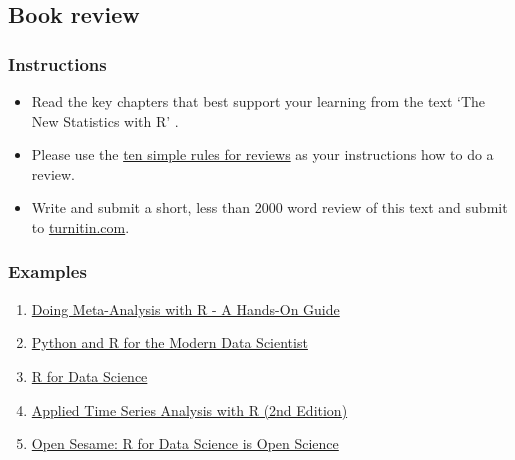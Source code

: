 \documentclass[
]{book}
\providecommand{\tightlist}{%
  \setlength{\itemsep}{0pt}\setlength{\parskip}{0pt}}
\begin{document}
\hypertarget{book-review}{%
\subsection*{Book review}\label{book-review}}

\hypertarget{instructions-1}{%
\subsubsection*{Instructions}\label{instructions-1}}

\begin{itemize}
\tightlist
\item
  Read the key chapters that best support your learning from the text `The New Statistics with R' \citep{RN6087}.\\
\item
  Please use the \href{https://journals.plos.org/ploscompbiol/article?id=10.1371/journal.pcbi.1006562}{ten simple rules for reviews} \citep{RN6148} as your instructions how to do a review.\\
\item
  Write and submit a short, less than 2000 word review of this text and submit to \href{https://www.turnitin.com}{turnitin.com}.
\end{itemize}

\hypertarget{examples}{%
\subsubsection*{Examples}\label{examples}}

\begin{enumerate}
\def\labelenumi{\arabic{enumi}.}
\item
  \href{https://www.jstatsoft.org/article/view/v102b02}{Doing Meta-Analysis with R - A Hands-On Guide}
\item
  \href{https://www.jstatsoft.org/article/view/v103b02}{Python and R for the Modern Data Scientist}
\item
  \href{https://www.jstatsoft.org/article/view/v077b01}{R for Data Science}
\item
  \href{https://www.jstatsoft.org/article/view/v085b03}{Applied Time Series Analysis with R (2nd Edition)}
\item
  \href{https://ojs.library.queensu.ca/index.php/IEE/article/view/6559}{Open Sesame: R for Data Science is Open Science}
\end{enumerate}
\end{document}
